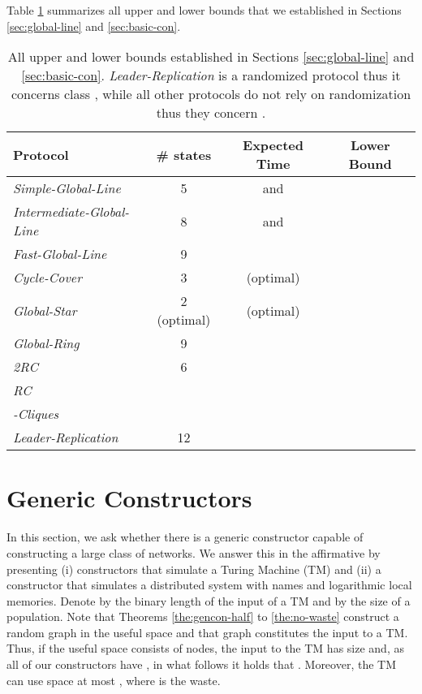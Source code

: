 \documentclass[oribibl, 11pt]{llncs}
\begin{document}
Table \ref{tab:ulb} summarizes all upper and lower bounds that we established in Sections \ref{sec:global-line} and \ref{sec:basic-con}.

\begin{table}[h]
\normalsize
\setlength{\tabcolsep}{15pt}
\begin{center}
\begin{tabular}{  l  c  c c  }
  \hline
  Protocol & \# states & Expected Time & Lower Bound \\ \hline
  \emph{Simple-Global-Line} & 5 &  and  &  \\
  \emph{Intermediate-Global-Line} & 8 &  and  &  \\ 
  \emph{Fast-Global-Line} & 9 &  &  \\
  \emph{Cycle-Cover} & 3 &  (optimal) &  \\
  \emph{Global-Star} & 2 (optimal) &  (optimal) &  \\ 
  \emph{Global-Ring} & 9 & &  \\ 
  \emph{2RC} & 6 & &  \\ 
  \emph{RC} &  &  &  \\ 
  \emph{-Cliques} &  &  &  \\
  \emph{Leader-Replication} & 12 &  & \\ \hline
\end{tabular}
\end{center}
\caption{All upper and lower bounds established in Sections \ref{sec:global-line} and \ref{sec:basic-con}. \emph{Leader-Replication} is a randomized protocol thus it concerns class , while all other protocols do not rely on randomization thus they concern .}
\label{tab:ulb}
\end{table}

\section{Generic Constructors}
\label{sec:gencon}

In this section, we ask whether there is a generic constructor capable of constructing a large class of networks. We answer this in the affirmative by presenting (i) constructors that simulate a Turing Machine (TM) and (ii) a constructor that simulates a distributed system with names and logarithmic local memories. Denote by  the binary length of the input of a TM and by  the size of a population. Note that Theorems \ref{the:gencon-half} to \ref{the:no-waste} construct a random graph in the useful space and that graph constitutes the input to a TM. Thus, if the useful space consists of  nodes, the input to the TM has size  and, as all of our constructors have , in what follows it holds that . Moreover, the TM can use space at most , where  is the waste.
\end{document}
